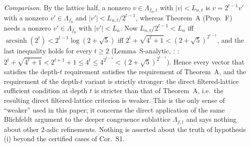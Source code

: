 \emph{Comparison.} By the lattice half, a nonzero $v\in\Lambda_{f_0,t}$ with $|v|<L_{n,t}$ is $v=2^{t-1}v'$ with a nonzero $v'\in\Lambda_{f_0}$ and $|v'|<L_{n,t}/2^{t-1}$, whereas Theorem~A (Prop.~F) needs a nonzero $v'\in\Lambda_{f_0}$ with $|v'|<L_n$. Now $L_{n,t}/2^{t-1}<L_n$ iff $\operatorname{arcsinh}(2^t)<2^{t-1}\log(2+\sqrt5)$ iff $2^t+\sqrt{4^t+1}<(2+\sqrt5)^{2^{t-1}}$, and the last inequality holds for every $t\ge2$ (Lemma~S-analytic, : : $2^t+\sqrt{4^t+1}<2^{t+1}+1\le4^t\le4^{2^{t-1}}<(2+\sqrt5)^{2^{t-1}}$). Hence every vector that satisfies the depth-$t$ requirement satisfies the requirement of Theorem~A, and the requirement of the depth-$t$ variant is strictly stronger: the direct filtered-lattice sufficient condition at depth $t$ is stricter than that of Theorem~A, i.e.\ the resulting direct filtered-lattice criterion is weaker. This is the only sense of ``weaker'' used in this paper; it concerns the direct application of the same Blichfeldt argument to the deeper congruence sublattice $\Lambda_{f,t}$ and says nothing about other $2$-adic refinements. Nothing is asserted about the truth of hypothesis (i) beyond the certified cases of Cor.~S1.
